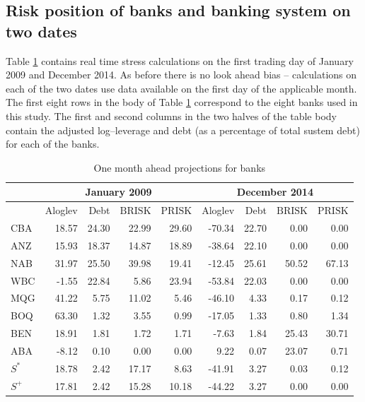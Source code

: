 \documentclass[authoryear]{elsarticle}
\newcommand{\E}{{\mathrm E}}
\newcommand{\tref}[1]{Table \ref{#1}}
\newcommand{\br}{\ensuremath{\mathrm{BRISK}}}
\newcommand{\pr}{\ensuremath{\mathrm{PRISK}}}
\begin{document}
\subsection{Risk position of banks and banking system on two dates}

\tref{twodates} contains real time stress calculations on the first trading day of  January 2009 and December 2014.  As before there is no look ahead bias -- calculations on each of the two dates use data available on the first day of the applicable month.   The first eight rows in the body of \tref{twodates} correspond to the eight banks used in this study.  The first  and second columns in the two halves of the table body contain the adjusted log--leverage  and debt  (as a percentage of total sustem debt) for each of the banks.

\begin{table}[ht]
\caption{One month ahead projections for banks}
\label{twodates}
\centering
\begin{threeparttable}
\small
\vspace{4mm}
\begin{tabular}{l|rrrr|rrrr}
\hline
&\multicolumn{4}{c|}{January 2009}&\multicolumn{4}{c}{December 2014}\\
  \hline
   & Aloglev& Debt & \br  & \pr  & Aloglev & Debt  &\br & \pr\\
  \hline
CBA & 18.57 & 24.30 & 22.99 & 29.60 & -70.34 & 22.70 & 0.00 & 0.00 \\
  ANZ & 15.93 & 18.37 & 14.87 & 18.89 & -38.64 & 22.10 & 0.00 & 0.00 \\
  NAB & 31.97 & 25.50 & 39.98 & 19.41 & -12.45 & 25.61 & 50.52 & 67.13 \\
  WBC & -1.55 & 22.84 & 5.86 & 23.94 & -53.84 & 22.03 & 0.00 & 0.00 \\
  MQG & 41.22 & 5.75 & 11.02 & 5.46 & -46.10 & 4.33 & 0.17 & 0.12 \\
  BOQ & 63.30 & 1.32 & 3.55 & 0.99 & -17.05 & 1.33 & 0.80 & 1.34 \\
  BEN & 18.91 & 1.81 & 1.72 & 1.71 & -7.63 & 1.84 & 25.43 & 30.71 \\
  ABA & -8.12 & 0.10 & 0.00 & 0.00 & 9.22 & 0.07 & 23.07 & 0.71 \\
  \hline
  $S^*$ & 18.78 & 2.42 & 17.17 & 8.63 & -41.91 & 3.27 & 0.03 & 0.12 \\
  $S^+$ & 17.81 & 2.42 & 15.28 & 10.18 & -44.22 & 3.27 & 0.00 & 0.00 \\ \hline

\end{tabular}
\end{threeparttable}
\end{table}
\end{document}
